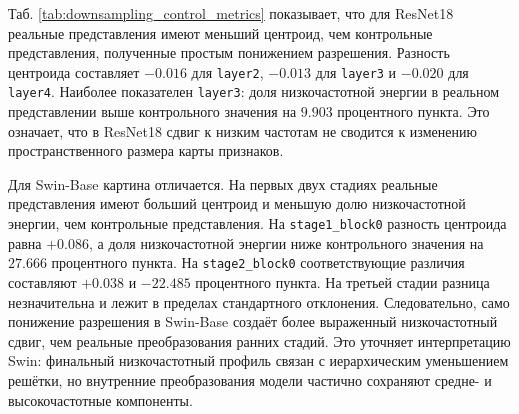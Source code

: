 Таб. \ref{tab:downsampling_control_metrics} показывает, что для ResNet18 реальные представления имеют меньший центроид, чем контрольные представления, полученные простым понижением разрешения. Разность центроида составляет $-0.016$ для \texttt{layer2}, $-0.013$ для \texttt{layer3} и $-0.020$ для \texttt{layer4}. Наиболее показателен \texttt{layer3}: доля низкочастотной энергии в реальном представлении выше контрольного значения на $9.903$ процентного пункта. Это означает, что в ResNet18 сдвиг к низким частотам не сводится к изменению пространственного размера карты признаков.

Для Swin-Base картина отличается. На первых двух стадиях реальные представления имеют больший центроид и меньшую долю низкочастотной энергии, чем контрольные представления. На \texttt{stage1\_block0} разность центроида равна $+0.086$, а доля низкочастотной энергии ниже контрольного значения на $27.666$ процентного пункта. На \texttt{stage2\_block0} соответствующие различия составляют $+0.038$ и $-22.485$ процентного пункта. На третьей стадии разница незначительна и лежит в пределах стандартного отклонения. Следовательно, само понижение разрешения в Swin-Base создаёт более выраженный низкочастотный сдвиг, чем реальные преобразования ранних стадий. Это уточняет интерпретацию Swin: финальный низкочастотный профиль связан с иерархическим уменьшением решётки, но внутренние преобразования модели частично сохраняют средне- и высокочастотные компоненты.

\begin{table}[h]
\centering
\caption{Внутристадийный контроль при фиксированном пространственном разрешении}
\label{tab:within_stage_control_metrics}
\vspace{1ex}
\end{table}

